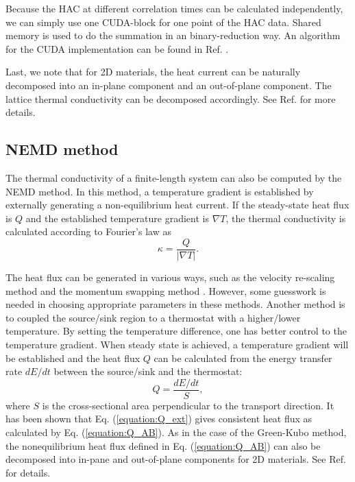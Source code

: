 \documentclass[12pt,a4paper]{report}
\begin{document}
Because the HAC at different correlation times can be calculated independently, we can simply use one CUDA-block for one point of the  HAC data. Shared memory is used to do the summation in an binary-reduction way. An algorithm for the CUDA implementation can be found in Ref. \cite{fan2013cpc}.

Last, we note that for 2D materials, the heat current can be naturally decomposed into an in-plane component and an out-of-plane component. The lattice thermal conductivity can be decomposed accordingly. See Ref. \cite{fan2017prb} for more details.



\subsection{NEMD method}

The thermal conductivity of a finite-length system can also be computed by the NEMD method. In this method, a temperature gradient is established by externally generating a non-equilibrium heat current. If the steady-state heat flux is $Q$ and the established temperature gradient is $\nabla T$, the thermal conductivity is calculated according to Fourier's law as
\begin{equation}
\boxed{\kappa = \frac{Q} { |\nabla T|}}.
\end{equation}

The heat flux can be generated in various ways, such as the velocity re-scaling method \cite{ikeshoji1994mp,jund1999prb} and the momentum swapping method  \cite{plathe1997jcp}. However, some guesswork is needed in choosing appropriate parameters in these methods. Another method is to coupled the source/sink region to a thermostat with a higher/lower temperature. By setting the temperature difference, one has better control to the temperature gradient. When steady state is achieved, a temperature gradient will be established and the heat flux $Q$ can be calculated from the energy transfer rate $d E/d t$ between the source/sink and the thermostat:
\begin{equation}
\boxed{
Q=\frac{dE/dt}{S}
},
\label{equation:Q_ext}
\end{equation}
where $S$ is the cross-sectional area perpendicular to the transport direction. It has been shown \cite{fan2017prb} that Eq. (\ref{equation:Q_ext}) gives consistent heat flux as calculated by Eq. (\ref{equation:Q_AB}). As in the case of the Green-Kubo method, the nonequilibrium heat flux defined in Eq. (\ref{equation:Q_AB}) can also be decomposed into in-pane and out-of-plane components for 2D materials. See Ref. \cite{fan2017prb} for details.
\end{document}

